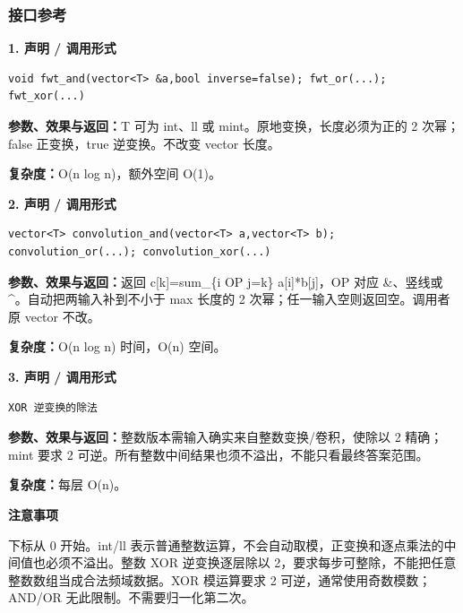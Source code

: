 \documentclass[UTF8,a4paper,10pt]{ctexart}
\newcommand{\TemplNote}[1]{\textbf{注意事项}\par #1\par}
\begin{document}
\subsubsection*{接口参考}
\noindent\begin{minipage}{\textwidth}
\textbf{1. 声明 / 调用形式}
\begin{lstlisting}
void fwt_and(vector<T> &a,bool inverse=false); fwt_or(...); fwt_xor(...)
\end{lstlisting}
\textbf{参数、效果与返回：}T 可为 int、ll 或 mint。原地变换，长度必须为正的 2 次幂；false 正变换，true 逆变换。不改变 vector 长度。

\textbf{复杂度：}O(n log n)，额外空间 O(1)。

\end{minipage}\par\vspace{0.4em}
\noindent\begin{minipage}{\textwidth}
\textbf{2. 声明 / 调用形式}
\begin{lstlisting}
vector<T> convolution_and(vector<T> a,vector<T> b); convolution_or(...); convolution_xor(...)
\end{lstlisting}
\textbf{参数、效果与返回：}返回 c[k]=sum\_\{i OP j=k\} a[i]*b[j]，OP 对应 \&、竖线或 \textasciicircum{}。自动把两输入补到不小于 max 长度的 2 次幂；任一输入空则返回空。调用者原 vector 不改。

\textbf{复杂度：}O(n log n) 时间，O(n) 空间。

\end{minipage}\par\vspace{0.4em}
\noindent\begin{minipage}{\textwidth}
\textbf{3. 声明 / 调用形式}
\begin{lstlisting}
XOR 逆变换的除法
\end{lstlisting}
\textbf{参数、效果与返回：}整数版本需输入确实来自整数变换/卷积，使除以 2 精确；mint 要求 2 可逆。所有整数中间结果也须不溢出，不能只看最终答案范围。

\textbf{复杂度：}每层 O(n)。

\TemplNote{下标从 0 开始。int/ll 表示普通整数运算，不会自动取模，正变换和逐点乘法的中间值也必须不溢出。整数 XOR 逆变换逐层除以 2，要求每步可整除，不能把任意整数数组当成合法频域数据。XOR 模运算要求 2 可逆，通常使用奇数模数；AND/OR 无此限制。不需要归一化第二次。}
\end{minipage}\par\vspace{0.4em}
\clearpage
\end{document}
